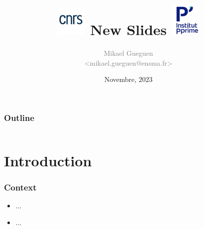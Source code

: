 \documentclass[aspectratio=169,utf8]{ctexbeamer}
\title[Beamer Slides]{\centering \includegraphics[width=1.5cm]{./figs/cnrs-logo_cnrs_2019_blanc} New Slides  \includegraphics[width=1.5cm]{./figs/new-logo-pprime.png}}
\author[MG]{\scriptsize \textcolor{gray}{Mikael Gueguen\\ <mikael.gueguen@ensma.fr>}}
\date{Novembre, $2023$}
\begin{document}
\addtocounter{framenumber}{-1}


\begin{frame}
  \titlepage
\end{frame}

\begin{frame}
  \frametitle{Outline}

  \centering

  \begin{minipage}{.75\textwidth}

    \begin{columns}[t]
      \begin{column}{.5\textwidth}
        \tableofcontents[sections={1-5}]
      \end{column}
      \begin{column}{.5\textwidth}
        \tableofcontents[sections={6-10}]
      \end{column}
    \end{columns}

  \end{minipage}

\end{frame}


\section{Introduction}

\begin{frame}
  \frametitle{Context}

  \begin{itemize}
    \setlength{\itemsep}{8pt}
    	\item ...
	\item ...
  \end{itemize}

\end{frame}
\end{document}
